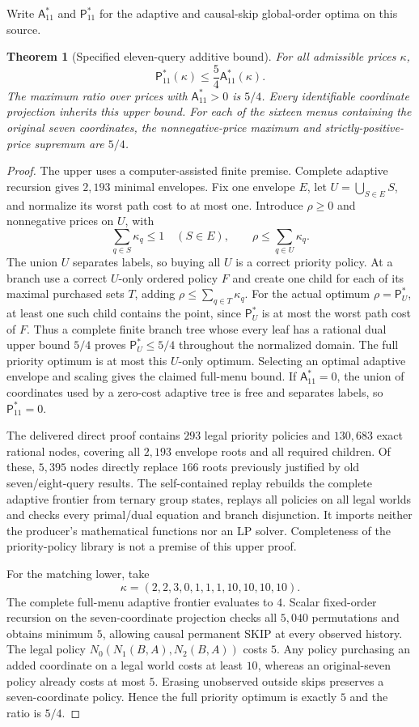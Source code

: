 \documentclass[pdflatex,sn-mathphys-num]{sn-jnl}
\newcommand{\A}{\mathsf{A}}
\newcommand{\Pcost}{\mathsf{P}}
\theoremstyle{thmstyleone}
\newtheorem{theorem}{Theorem}
\theoremstyle{thmstylethree}
\theoremstyle{thmstyletwo}
\begin{document}
Write $\A^*_{11}$ and $\Pcost^*_{11}$ for the adaptive and causal-skip
global-order optima on this source.
\newpage
\begin{theorem}[Specified eleven-query additive bound]
\label{thm:full11-copy-pin}
For all admissible prices $\kappa$,
\[
 \Pcost^*_{11}(\kappa)\leq\frac54\A^*_{11}(\kappa).
\]
The maximum ratio over prices with $\A^*_{11}>0$ is $5/4$.
Every identifiable coordinate projection inherits this upper bound.
For each of the sixteen menus containing the original seven coordinates,
the nonnegative-price maximum and strictly-positive-price supremum are
$5/4$.
\end{theorem}
\begin{proof}
The upper uses a computer-assisted finite premise. Complete adaptive
recursion gives $2,193$ minimal envelopes. Fix one envelope $E$, let
$U=\bigcup_{S\in E}S$, and normalize its worst path cost to at most one.
Introduce $\rho\geq0$ and nonnegative prices on $U$, with
\[
 \sum_{q\in S}\kappa_q\leq1\quad(S\in E),
 \qquad \rho\leq\sum_{q\in U}\kappa_q.
\]
The union $U$ separates labels, so buying all $U$ is a correct priority
policy. At a branch use a correct $U$-only ordered policy $F$ and create
one child for each of its maximal purchased sets $T$, adding
$\rho\leq\sum_{q\in T}\kappa_q$.
For the actual optimum $\rho=\Pcost^*_U$, at least one such child contains
the point, since $\Pcost^*_U$ is at most the worst path cost of $F$.
Thus a complete finite branch tree whose every leaf has a rational dual
upper bound $5/4$ proves $\Pcost^*_U\leq5/4$ throughout the normalized
domain. The full priority optimum is at most this $U$-only optimum.
Selecting an optimal adaptive envelope and scaling gives the
claimed full-menu bound. If $\A^*_{11}=0$, the union of coordinates used
by a zero-cost adaptive tree is free and separates labels, so
$\Pcost^*_{11}=0$.

The delivered direct proof contains $293$ legal priority policies and
$130,683$ exact rational nodes, covering all $2,193$ envelope roots and
all required children. Of these, $5,395$ nodes directly replace $166$
roots previously justified by old seven/eight-query results. The
self-contained replay rebuilds the complete adaptive frontier from
ternary group states, replays all policies on all legal worlds and
checks every primal/dual equation and branch disjunction. It imports
neither the producer's mathematical functions nor an LP solver.
Completeness of the priority-policy library is not a premise of this
upper proof.

For the matching lower, take
\[
 \kappa=(2,2,3,0,1,1,1,10,10,10,10).
\]
The complete full-menu adaptive frontier evaluates to $4$.
Scalar fixed-order recursion on the seven-coordinate projection checks
all $5,040$ permutations and obtains minimum $5$, allowing causal
permanent SKIP at every observed history. The legal policy
$N_0(N_1(B,A),N_2(B,A))$ costs $5$.
Any policy purchasing an added coordinate on a legal world costs at
least $10$, whereas an original-seven policy already costs at most $5$.
Erasing unobserved outside skips preserves a seven-coordinate policy.
Hence the full priority optimum is exactly $5$ and the ratio is $5/4$.


\end{proof}
\end{document}

